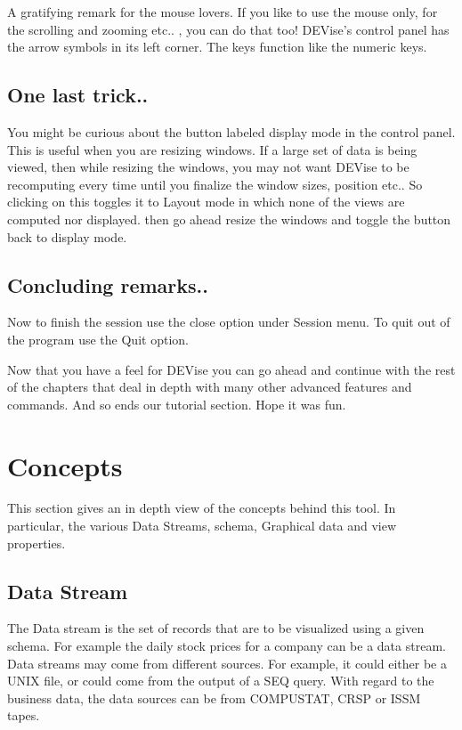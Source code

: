 	
	A gratifying remark for the mouse lovers. If you like to use the mouse only, for the scrolling and zooming etc.. , you can do that too! DEVise's control panel has the arrow symbols in its left corner. The keys function like the numeric keys.


\subsection{One last trick..}

	
	You might be curious about the button labeled display mode in the control panel. This is useful when you are resizing windows. If a large set of data is being viewed, then while resizing the windows, you may not want DEVise to be recomputing every time until you finalize the window sizes, position etc.. So clicking on this toggles it to Layout mode in which none of the views are computed nor displayed. then go ahead resize the windows and toggle the button back to display mode.



\subsection{ Concluding remarks..}

	Now to finish the session use the close option under Session menu. To quit out of the program use the Quit option.
	
	Now that you have a feel for DEVise you can go ahead and continue with the rest of the chapters that deal in depth with many other advanced features and commands. And so ends our tutorial section. Hope it was fun.


\newpage

\section{\Devise Concepts}

	 This section gives an in depth view of the concepts behind this tool. In particular, the various Data Streams, schema, Graphical data and view properties. 

\subsection{Data Stream}

	The Data stream is the set of records that are to be visualized using a given schema. For example the daily stock prices for a company can be a data stream. Data streams may come from different sources. For example, it could either be a UNIX file, or could come from the output of a SEQ query. With regard to the business data, the data sources can be from COMPUSTAT, CRSP or ISSM tapes.

